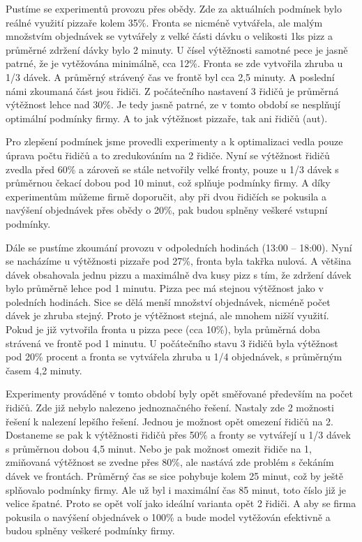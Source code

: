 \documentclass[a4paper, 12pt]{article}[9.12.2013]
\begin{document}
Pustíme se experimentů provozu přes obědy. Zde za aktuálních podmínek bylo
reálné využití pizzaře kolem 35\%. Fronta se nicméně vytvářela, ale malým
množstvím objednávek se vytvářely z velké části dávku o velikosti 1ks pizz a
průměrné zdržení dávky bylo 2 minuty. U čísel výtěžnosti samotné pece je jasně
patrné, že je vytěžována minimálně, cca 12\%. Fronta se zde vytvořila zhruba u
1/3 dávek. A průměrný strávený čas ve frontě byl cca 2,5 minuty. A poslední
námi zkoumaná část jsou řidiči. Z počátečního nastavení 3 řidičů je průměrná
výtěžnost lehce nad 30\%. Je tedy jasně patrné, ze v tomto období se nesplňují
optimální podmínky firmy. A to jak výtěžnost pizzaře, tak ani řidičů (aut).

Pro zlepšení podmínek jsme provedli experimenty a k optimalizaci vedla pouze
úprava počtu řidičů a to zredukováním na 2 řidiče. Nyní se výtěžnost řidičů
zvedla před 60\% a zároveň se stále netvořily velké fronty, pouze u 1/3 dávek s
průměrnou čekací dobou pod 10 minut, což splňuje podmínky firmy. A díky
experimentům můžeme firmě doporučit, aby při dvou řidičích se pokusila a
navýšení objednávek přes obědy o 20\%, pak budou splněny veškeré vstupní
podmínky.

Dále se pustíme zkoumání provozu v odpoledních hodinách (13:00 – 18:00). Nyní
se nacházíme u výtěžnosti pizzaře pod 27\%, fronta byla takřka nulová. A většina
dávek obsahovala jednu pizzu a maximálně dva kusy pizz s tím, že zdržení dávek
bylo průměrně lehce pod 1 minutu. Pizza pec má stejnou výtěžnost jako v
poledních hodinách. Sice se dělá menší množství objednávek, nicméně počet dávek
je zhruba stejný. Proto je výtěžnost stejná, ale mnohem nižší využití. Pokud je
již vytvořila fronta u pizza pece (cca 10\%), byla průměrná doba strávená ve
frontě pod 1 minutu. U počátečního stavu 3 řidičů byla výtěžnost pod 20\%
procent a fronta se vytvářela zhruba u 1/4 objednávek, s průměrným časem 4,2
minuty.

Experimenty prováděné v tomto období byly opět směřované především na
počet řidičů. Zde již nebylo nalezeno jednoznačného řešení. Nastaly zde 2
možnosti řešení k nalezení lepšího řešení. Jednou je možnost opět omezení
řidičů na 2. Dostaneme se pak k výtěžnosti řidičů přes 50\% a fronty se
vytvářejí u 1/3 dávek s průměrnou dobou 4,5 minut. Nebo je pak možnost omezit
řidiče na 1, zmiňovaná výtěžnost se zvedne přes 80\%, ale nastává zde problém s
čekáním dávek ve frontách. Průměrný čas se sice pohybuje kolem 25 minut, což by
ještě splňovalo podmínky firmy. Ale už byl i maximální čas 85 minut, toto číslo
již je velice špatné. Proto se opět volí jako ideální varianta opět 2 řidiči. A
aby se firma pokusila o navýšení objednávek o 100\% a bude model vytěžován
efektivně a budou splněny veškeré podmínky firmy.
\end{document}
